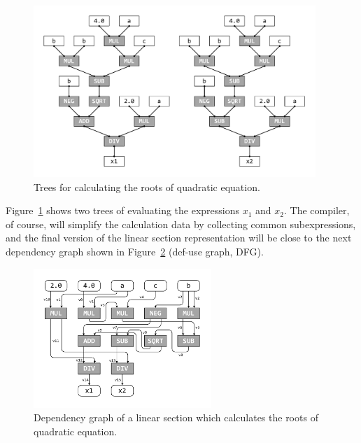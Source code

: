 \documentclass[
11pt,%
tightenlines,%
twoside,%
onecolumn,%
nofloats,%
nobibnotes,%
nofootinbib,%
superscriptaddress,%
noshowpacs,%
centertags]%
{revtex4}
\begin{document}
\begin{figure}[h]
\setcaptionmargin{5mm}
\includegraphics[width=0.95\textwidth]{pics/square_equation_calculation_tree.pdf}
\caption{Trees for calculating the roots of quadratic equation.}\label{fig:square_equation_calculation_tree}
\end{figure}

Figure~\ref{fig:square_equation_calculation_tree} shows two trees of evaluating the expressions $x_1$ and $x_2$.
The compiler, of course, will simplify the calculation data by collecting common subexpressions, and the final version of the linear section representation will be close to the next dependency graph shown in Figure~\ref{fig:def_use} (def-use graph, DFG).

\begin{figure}[h]
\setcaptionmargin{5mm}
\onelinecaptionsfalse %
\includegraphics[width=0.60\textwidth]{pics/def_use.pdf}
\caption{Dependency graph of a linear section which calculates the roots of quadratic equation.}\label{fig:def_use}
\end{figure}
\end{document}
